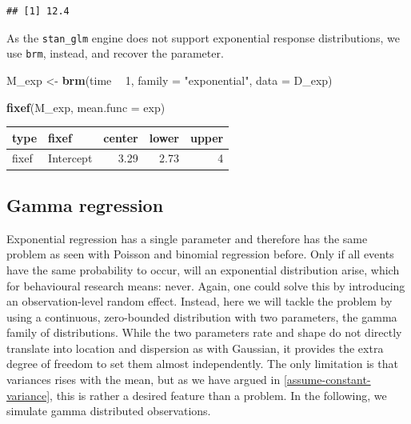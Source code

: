 \documentclass[]{svmono}
\newenvironment{Shaded}{\begin{snugshade}}{\end{snugshade}}
\newcommand{\KeywordTok}[1]{\textcolor[rgb]{0.13,0.29,0.53}{\textbf{#1}}}
\newcommand{\DataTypeTok}[1]{\textcolor[rgb]{0.13,0.29,0.53}{#1}}
\newcommand{\DecValTok}[1]{\textcolor[rgb]{0.00,0.00,0.81}{#1}}
\newcommand{\StringTok}[1]{\textcolor[rgb]{0.31,0.60,0.02}{#1}}
\newcommand{\OperatorTok}[1]{\textcolor[rgb]{0.81,0.36,0.00}{\textbf{#1}}}
\newcommand{\NormalTok}[1]{#1}
\theoremstyle{definition}
\theoremstyle{definition}
\theoremstyle{definition}
\theoremstyle{remark}
\begin{document}
\begin{Shaded}
\end{Shaded}

\begin{verbatim}
## [1] 12.4
\end{verbatim}

As the \texttt{stan\_glm} engine does not support exponential response
distributions, we use \texttt{brm}, instead, and recover the parameter.

\begin{Shaded}
\begin{Highlighting}[]
\NormalTok{M_exp <-}\StringTok{ }\KeywordTok{brm}\NormalTok{(time }\OperatorTok{~}\StringTok{ }\DecValTok{1}\NormalTok{, }
             \DataTypeTok{family =} \StringTok{"exponential"}\NormalTok{, }
             \DataTypeTok{data =}\NormalTok{ D_exp)}
\end{Highlighting}
\end{Shaded}

\begin{Shaded}
\begin{Highlighting}[]
\KeywordTok{fixef}\NormalTok{(M_exp, }\DataTypeTok{mean.func =}\NormalTok{ exp)}
\end{Highlighting}
\end{Shaded}

\begin{longtable}[]{@{}llrrr@{}}
\toprule
type & fixef & center & lower & upper\tabularnewline
\midrule
\endhead
fixef & Intercept & 3.29 & 2.73 & 4\tabularnewline
\bottomrule
\end{longtable}

\subsection{Gamma regression}\label{gamma-regression}

Exponential regression has a single parameter and therefore has the same
problem as seen with Poisson and binomial regression before. Only if all
events have the same probability to occur, will an exponential
distribution arise, which for behavioural research means: never. Again,
one could solve this by introducing an observation-level random effect.
Instead, here we will tackle the problem by using a continuous,
zero-bounded distribution with two parameters, the gamma family of
distributions. While the two parameters rate and shape do not directly
translate into location and dispersion as with Gaussian, it provides the
extra degree of freedom to set them almost independently. The only
limitation is that variances rises with the mean, but as we have argued
in \ref{assume-constant-variance}, this is rather a desired feature than
a problem. In the following, we simulate gamma distributed observations.
\end{document}
